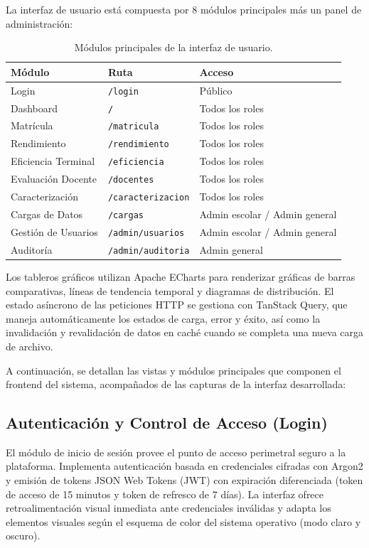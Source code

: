 La interfaz de usuario está compuesta por 8 módulos principales más un panel de administración:

\begin{table}[H]
\centering
\begin{tabular}{|l|l|l|}
\hline
\textbf{Módulo} & \textbf{Ruta} & \textbf{Acceso} \\
\hline
Login & \texttt{/login} & Público \\
Dashboard & \texttt{/} & Todos los roles \\
Matrícula & \texttt{/matricula} & Todos los roles \\
Rendimiento & \texttt{/rendimiento} & Todos los roles \\
Eficiencia Terminal & \texttt{/eficiencia} & Todos los roles \\
Evaluación Docente & \texttt{/docentes} & Todos los roles \\
Caracterización & \texttt{/caracterizacion} & Todos los roles \\
Cargas de Datos & \texttt{/cargas} & Admin escolar / Admin general \\
Gestión de Usuarios & \texttt{/admin/usuarios} & Admin escolar / Admin general \\
Auditoría & \texttt{/admin/auditoria} & Admin general \\
\hline
\end{tabular}
\caption{Módulos principales de la interfaz de usuario.}
\end{table}

Los tableros gráficos utilizan Apache ECharts para renderizar gráficas de barras comparativas, líneas de tendencia temporal y diagramas de distribución. El estado asíncrono de las peticiones HTTP se gestiona con TanStack Query, que maneja automáticamente los estados de carga, error y éxito, así como la invalidación y revalidación de datos en caché cuando se completa una nueva carga de archivo.

A continuación, se detallan las vistas y módulos principales que componen el frontend del sistema, acompañados de las capturas de la interfaz desarrollada:

\subsection{Autenticación y Control de Acceso (Login)}

El módulo de inicio de sesión provee el punto de acceso perimetral seguro a la plataforma. Implementa autenticación basada en credenciales cifradas con Argon2 y emisión de tokens JSON Web Tokens (JWT) con expiración diferenciada (token de acceso de 15 minutos y token de refresco de 7 días). La interfaz ofrece retroalimentación visual inmediata ante credenciales inválidas y adapta los elementos visuales según el esquema de color del sistema operativo (modo claro y oscuro).


